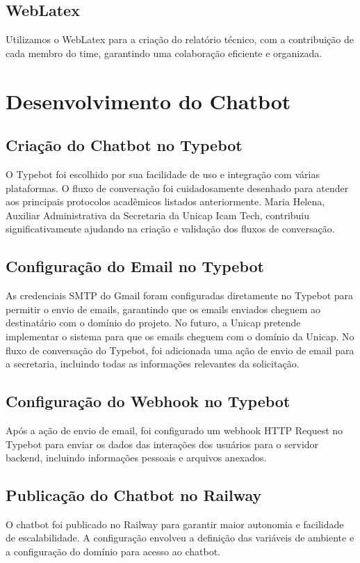 \documentclass[12pt,a4paper]{article} %
\begin{document}
\subsection{WebLatex}
Utilizamos o WebLatex para a criação do relatório técnico, com a contribuição de cada membro do time, garantindo uma colaboração eficiente e organizada.

\section{Desenvolvimento do Chatbot}

\subsection{Criação do Chatbot no Typebot}
O Typebot foi escolhido por sua facilidade de uso e integração com várias plataformas. O fluxo de conversação foi cuidadosamente desenhado para atender aos principais protocolos acadêmicos listados anteriormente. Maria Helena, Auxiliar Administrativa da Secretaria da Unicap Icam Tech, contribuiu significativamente ajudando na criação e validação dos fluxos de conversação.

\subsection{Configuração do Email no Typebot}
As credenciais SMTP do Gmail foram configuradas diretamente no Typebot para permitir o envio de emails, garantindo que os emails enviados cheguem ao destinatário com o domínio do projeto. No futuro, a Unicap pretende implementar o sistema para que os emails cheguem com o domínio da Unicap. No fluxo de conversação do Typebot, foi adicionada uma ação de envio de email para a secretaria, incluindo todas as informações relevantes da solicitação.

\subsection{Configuração do Webhook no Typebot}
Após a ação de envio de email, foi configurado um webhook HTTP Request no Typebot para enviar os dados das interações dos usuários para o servidor backend, incluindo informações pessoais e arquivos anexados.

\subsection{Publicação do Chatbot no Railway}
O chatbot foi publicado no Railway para garantir maior autonomia e facilidade de escalabilidade. A configuração envolveu a definição das variáveis de ambiente e a configuração do domínio para acesso ao chatbot.
\end{document}
